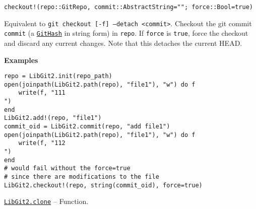 \begin{adjustwidth}{2em}{0pt}


\begin{verbatim}
checkout!(repo::GitRepo, commit::AbstractString=""; force::Bool=true)
\end{verbatim}

Equivalent to \texttt{git checkout [-f] --detach <commit>}. Checkout the git commit \texttt{commit} (a \hyperlink{202290709580230708}{\texttt{GitHash}} in string form) in \texttt{repo}. If \texttt{force} is \texttt{true}, force the checkout and discard any current changes. Note that this detaches the current HEAD.

\textbf{Examples}


\begin{verbatim}
repo = LibGit2.init(repo_path)
open(joinpath(LibGit2.path(repo), "file1"), "w") do f
    write(f, "111
")
end
LibGit2.add!(repo, "file1")
commit_oid = LibGit2.commit(repo, "add file1")
open(joinpath(LibGit2.path(repo), "file1"), "w") do f
    write(f, "112
")
end
# would fail without the force=true
# since there are modifications to the file
LibGit2.checkout!(repo, string(commit_oid), force=true)
\end{verbatim}



\end{adjustwidth}
\hypertarget{7099795087604363090}{} 
\hyperlink{7099795087604363090}{\texttt{LibGit2.clone}}  -- {Function.}


